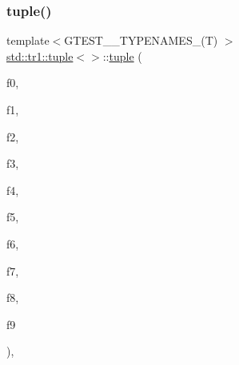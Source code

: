 \subsubsection{\texorpdfstring{tuple()}{tuple()}\hspace{0.1cm}{\footnotesize\ttfamily [2/4]}}
{\footnotesize\ttfamily template$<$G\+T\+E\+S\+T\+\_\+\_\+\+T\+Y\+P\+E\+N\+A\+M\+E\+S\+\_\+(\+T) $>$ \\
\hyperlink{classstd_1_1tr1_1_1tuple}{std\+::tr1\+::tuple}$<$$>$\+::\hyperlink{classstd_1_1tr1_1_1tuple}{tuple} (\begin{DoxyParamCaption}\item[{\hyperlink{namespacestd_1_1tr1_ae7b5ea477ac34a3eef5c4c15c42b76ed}{G\+T\+E\+S\+T\+\_\+\+B\+Y\+\_\+\+R\+E\+F\+\_\+}(T0)}]{f0,  }\item[{\hyperlink{namespacestd_1_1tr1_ae7b5ea477ac34a3eef5c4c15c42b76ed}{G\+T\+E\+S\+T\+\_\+\+B\+Y\+\_\+\+R\+E\+F\+\_\+}(T1)}]{f1,  }\item[{\hyperlink{namespacestd_1_1tr1_ae7b5ea477ac34a3eef5c4c15c42b76ed}{G\+T\+E\+S\+T\+\_\+\+B\+Y\+\_\+\+R\+E\+F\+\_\+}(T2)}]{f2,  }\item[{\hyperlink{namespacestd_1_1tr1_ae7b5ea477ac34a3eef5c4c15c42b76ed}{G\+T\+E\+S\+T\+\_\+\+B\+Y\+\_\+\+R\+E\+F\+\_\+}(T3)}]{f3,  }\item[{\hyperlink{namespacestd_1_1tr1_ae7b5ea477ac34a3eef5c4c15c42b76ed}{G\+T\+E\+S\+T\+\_\+\+B\+Y\+\_\+\+R\+E\+F\+\_\+}(T4)}]{f4,  }\item[{\hyperlink{namespacestd_1_1tr1_ae7b5ea477ac34a3eef5c4c15c42b76ed}{G\+T\+E\+S\+T\+\_\+\+B\+Y\+\_\+\+R\+E\+F\+\_\+}(T5)}]{f5,  }\item[{\hyperlink{namespacestd_1_1tr1_ae7b5ea477ac34a3eef5c4c15c42b76ed}{G\+T\+E\+S\+T\+\_\+\+B\+Y\+\_\+\+R\+E\+F\+\_\+}(T6)}]{f6,  }\item[{\hyperlink{namespacestd_1_1tr1_ae7b5ea477ac34a3eef5c4c15c42b76ed}{G\+T\+E\+S\+T\+\_\+\+B\+Y\+\_\+\+R\+E\+F\+\_\+}(T7)}]{f7,  }\item[{\hyperlink{namespacestd_1_1tr1_ae7b5ea477ac34a3eef5c4c15c42b76ed}{G\+T\+E\+S\+T\+\_\+\+B\+Y\+\_\+\+R\+E\+F\+\_\+}(T8)}]{f8,  }\item[{\hyperlink{namespacestd_1_1tr1_ae7b5ea477ac34a3eef5c4c15c42b76ed}{G\+T\+E\+S\+T\+\_\+\+B\+Y\+\_\+\+R\+E\+F\+\_\+}(T9)}]{f9 }\end{DoxyParamCaption})\hspace{0.3cm}{\ttfamily [inline]}, {\ttfamily [explicit]}}

\mbox{\label{classstd_1_1tr1_1_1tuple_ade1807f6e6b36daa6387c3b00dbd3be6}} 

